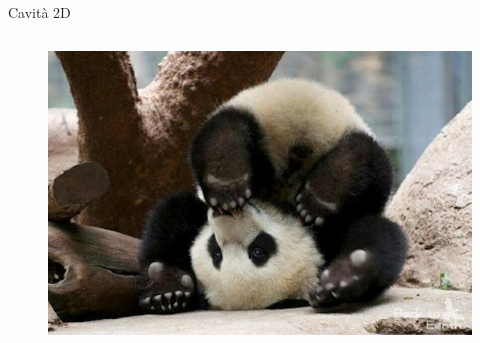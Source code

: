 \documentclass[10pt]{beamer}
\begin{document}
\begin{frame}{Cavità 2D}
\begin{minipage}{\textwidth}
\begin{columns}
  \begin{column}{.5\textwidth}
  \begin{figure}
    \includegraphics[scale=.2]{files/Panda.jpg}
  \end{figure}
    \end{column}
  \end{columns}
  \end{minipage}
  
  
 \end{frame}
\end{document}
